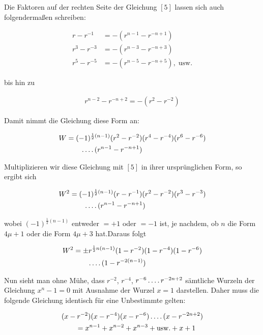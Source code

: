 
Die Faktoren auf der rechten Seite der Gleichung $[5]$ lassen sich auch folgendermaßen schreiben:

\[
\begin{aligned}
r-r^{-1}&=-(r^{n-1}-r^{-n+1})\\
r^3-r^{-3}&=-(r^{n-3}-r^{-n+3})\\
r^5-r^{-5}&=-(r^{n-5}-r^{-n+5}),\;\text{usw.}
\end{aligned}
\]

bis hin zu

\[
\begin{aligned}
r^{n-2}-r^{-n+2}=-(r^2-r^{-2})
\end{aligned}
\]

Damit nimmt die Gleichung diese Form an:


\[
\begin{aligned}
W&=(-1)^{\frac12(n-1)}(r^2-r^{-2})(r^4-r^{-4})(r^6-r^{-6})\\&\qquad\mathinner{.\,.\,.\,.}(r^{n-1}-r^{-n+1})
\end{aligned}
\]

Multiplizieren wir diese Gleichung mit $[5]$ in ihrer ursprünglichen Form, so ergibt sich

\[
\begin{aligned}
W^2&=(-1)^{\frac12(n-1)}(r-r^{-1})(r^2-r^{-2})(r^3-r^{-3})\\&\qquad\mathinner{.\,.\,.\,.}(r^{n-1}-r^{-n+1})
\end{aligned}
\]

wobei $(-1)^{\frac12(n-1)}$ entweder $=+1$ oder $=-1$ ist, je nachdem, ob $n$ die Form $4\mu+1$ oder die Form $4\mu+3$ hat.\quad Daraus folgt

\[
\begin{aligned}
W^2&=\pm r^{\frac12n(n-1)}(1-r^{-2})(1-r^{-4})(1-r^{-6})\\&\qquad\mathinner{.\,.\,.\,.}(1-r^{-2(n-1)})
\end{aligned}
\]

Nun sieht man ohne Mühe, dass $r^{-2}$, $r^{-4}$, $r^{-6}\mathinner{.\,.\,.\,.} r^{-2n+2}$ sämtliche Wurzeln der Gleichung $x^n-1=0$ mit Ausnahme der Wurzel $x=1$ darstellen. Daher muss die folgende Gleichung identisch für eine Unbestimmte gelten:

\[
\begin{aligned}
&(x-r^{-2})(x-r^{-4})(x-r^{-6})\mathinner{.\,.\,.\,.}(x-r^{-2n+2})\\&\qquad=x^{n-1}+x^{n-2}+x^{n-3}+\text{usw.}+x+1
\end{aligned}
\]

